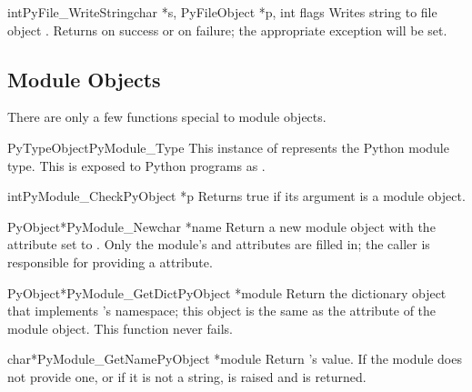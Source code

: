 \documentclass{manual}
\begin{document}
\begin{cfuncdesc}{int}{PyFile_WriteString}{char *s, PyFileObject *p,
                                           int flags}
Writes string  to file object .  Returns  on
success or  on failure; the appropriate exception will be
set.
\end{cfuncdesc}


\subsection{Module Objects \label{moduleObjects}}

There are only a few functions special to module objects.

\begin{cvardesc}{PyTypeObject}{PyModule_Type}
This instance of  represents the Python module
type.  This is exposed to Python programs as .
\end{cvardesc}

\begin{cfuncdesc}{int}{PyModule_Check}{PyObject *p}
Returns true if its argument is a module object.
\end{cfuncdesc}

\begin{cfuncdesc}{PyObject*}{PyModule_New}{char *name}
Return a new module object with the  attribute set to
.  Only the module's  and
 attributes are filled in; the caller is responsible
for providing a  attribute.
\end{cfuncdesc}

\begin{cfuncdesc}{PyObject*}{PyModule_GetDict}{PyObject *module}
Return the dictionary object that implements 's namespace; 
this object is the same as the  attribute of the
module object.  This function never fails.
\end{cfuncdesc}

\begin{cfuncdesc}{char*}{PyModule_GetName}{PyObject *module}
Return 's  value.  If the module does not 
provide one, or if it is not a string,  is
raised and \NULL{} is returned.
\end{cfuncdesc}
\end{document}
